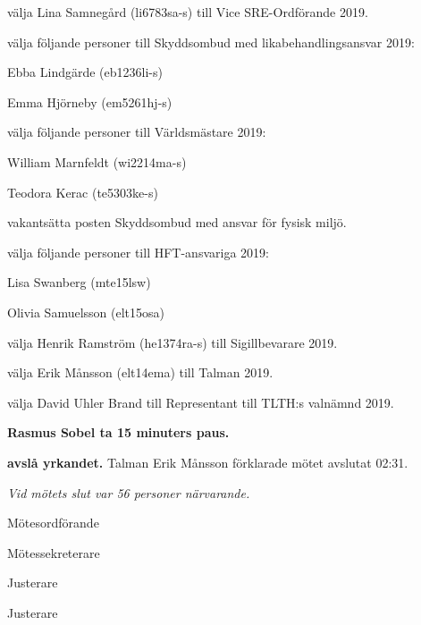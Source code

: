 \documentclass[10pt]{article}
\def\mo{Erik Månsson}
\def\ms{Axel Voss}
\def\ji{Rasmus Sobel}
\def\jii{Niklas Gustafson}
\begin{document}
\begin{paragrafer}
\begin{paralist}
    \Mba välja Lina Samnegård (li6783sa-s) till Vice SRE-Ordförande 2019.

    \Mba välja följande personer till Skyddsombud med likabehandlingsansvar 2019:
    \begin{tightdashlist}
        \item Ebba Lindgärde (eb1236li-s)
        \item Emma Hjörneby (em5261hj-s)
    \end{tightdashlist}

    \Mba välja följande personer till Världsmästare 2019:
    \begin{tightdashlist}
      \item William Marnfeldt (wi2214ma-s)
      \item Teodora Kerac (te5303ke-s)
    \end{tightdashlist}

    \Mba vakantsätta posten Skyddsombud med ansvar för fysisk miljö.

    \Mba välja följande personer till HFT-ansvariga 2019:
    \begin{tightdashlist}
        \item Lisa Swanberg (mte15lsw)
        \item Olivia Samuelsson (elt15osa)
    \end{tightdashlist}

    \Mba välja Henrik Ramström (he1374ra-s) till Sigillbevarare 2019.

    \Mba välja Erik Månsson (elt14ema) till Talman 2019.


    \Mba välja David Uhler Brand till Representant till TLTH:s valnämnd 2019.

\end{paralist}

\textbf{Rasmus Sobel \ypa ta 15 minuters paus.}

\textbf{\Mba avslå yrkandet.}
Talman {\mo} förklarade mötet avslutat 02:31.

\emph{Vid mötets slut var 56 personer närvarande.}

\end{paragrafer}

\newpage
\hidesignfoot
\begin{signatures}{4}
\signature{\mo}{Mötesordförande}
\signature{\ms}{Mötessekreterare}
\signature{\ji}{Justerare}
\signature{\jii}{Justerare}
\end{signatures}
\end{document}
